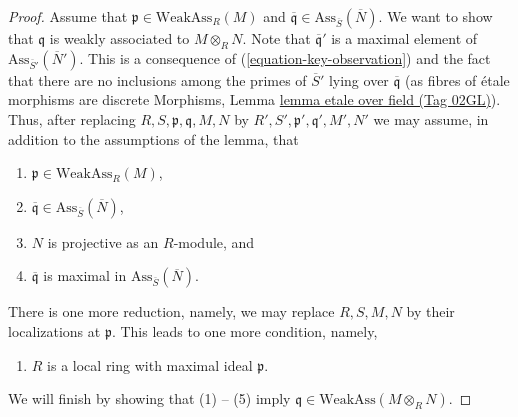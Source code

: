 \documentclass{amsart}
\theoremstyle{plain}
\theoremstyle{definition}
\theoremstyle{remark}
\numberwithin{equation}{subsection}
\begin{document}
\begin{proof}
\medskip\noindent
Assume that $\mathfrak p \in \text{WeakAss}_R(M)$ and
$\overline{\mathfrak q} \in \text{Ass}_{\overline{S}}(\overline{N})$.
We want to show that $\mathfrak q$ is weakly associated to $M \otimes_R N$.
Note that $\overline{\mathfrak q}'$ is a maximal element of
$\text{Ass}_{\overline{S}'}(\overline{N}')$.
This is a consequence of (\ref{equation-key-observation})
and the fact that there are no inclusions among the primes
of $\overline{S}'$ lying over $\overline{\mathfrak q}$
(as fibres of \'etale morphisms are discrete
Morphisms, Lemma \href{https://stacks.math.columbia.edu/tag/02GL}{lemma etale over field (Tag 02GL)}).
Thus, after replacing $R, S, \mathfrak p, \mathfrak q, M, N$ by
$R', S', \mathfrak p', \mathfrak q', M', N'$
we may assume, in addition to the assumptions of the lemma, that
\begin{enumerate}
\item $\mathfrak p \in \text{WeakAss}_R(M)$,
\item $\overline{\mathfrak q} \in \text{Ass}_{\overline{S}}(\overline{N})$,
\item $N$ is projective as an $R$-module, and
\item $\overline{\mathfrak q}$ is maximal in
$\text{Ass}_{\overline{S}}(\overline{N})$.
\end{enumerate}
There is one more reduction, namely, we may replace
$R, S, M, N$ by their localizations at $\mathfrak p$.
This leads to one more condition, namely,
\begin{enumerate}
\item[(5)] $R$ is a local ring with maximal ideal $\mathfrak p$.
\end{enumerate}
We will finish by showing that (1) -- (5) imply
$\mathfrak q \in \text{WeakAss}(M \otimes_R N)$.


\end{proof}
\end{document}
